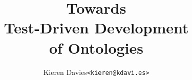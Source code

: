\documentclass[final]{beamer}
\title{Towards\\Test-Driven Development\\of Ontologies}
\author{Kieren Davies\hspace{0.5em}\nolinkurl{<kieren@kdavi.es>}}
\institute{%
  Department of Computer Science \\
  University of Cape Town
}
\begin{document}
\begin{frame}{}

\end{frame}
\end{document}

